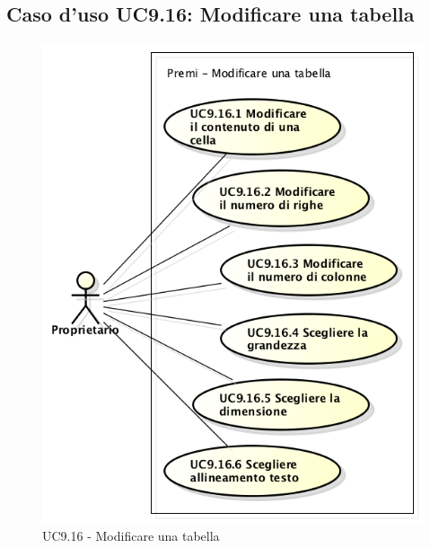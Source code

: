 \newpage
\subsection{Caso d'uso UC9.16: Modificare una tabella}
\begin{figure}[h] 
	\centering 
	\includegraphics[scale=0.45] {img/UC9.16.png}
	\caption{UC9.16 - Modificare una tabella}
\end{figure}

